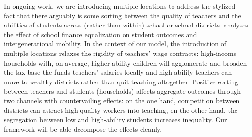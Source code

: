 \documentclass[onehalfspacing,11pt]{article}
\begin{document}
	In ongoing work, we are introducing multiple locations to address the stylized fact that there arguably is some sorting between the quality of teachers and the abilities of students across (rather than within) school or school districts. \cite{Biasi:2023} analyses the effect of school finance equalization on student outcomes and intergenerational mobility. In the context of our model, the introduction of multiple locations relaxes the rigidity of teachers' wage contracts: high-income households with, on average, higher-ability children will agglomerate and broaden the tax base the funds teachers' salaries locally and high-ability teachers can move to wealthy districts rather than quit teaching altogether. Positive sorting between teachers and students (households) affects aggregate outcomes through two channels with countervailing effects: on the one hand, competition between districts can attract high-quality workers into teaching, on the other hand, the segregation between low and high-ability students increases inequality. Our framework will be able decompose the effects cleanly.
	
	
	\newpage
	
	
	
	\newpage
	\appendix
\end{document}
